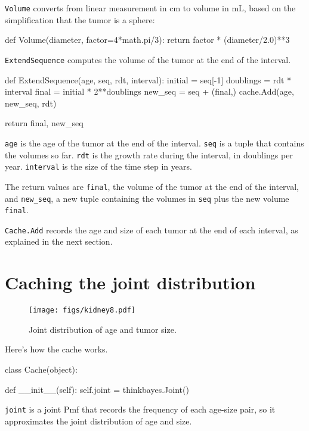 \documentclass[12pt]{book}
\theoremstyle{exercise}
\newcommand{\py}[1]{{\tt #1}}%
\begin{document}
\py{Volume} converts from linear measurement in cm to volume
in mL, based on the simplification that the tumor is a sphere:

\begin{code}
def Volume(diameter, factor=4*math.pi/3):
    return factor * (diameter/2.0)**3
\end{code}

\py{ExtendSequence} computes the volume of the tumor at the
end of the interval.

\begin{code}
def ExtendSequence(age, seq, rdt, interval):
    initial = seq[-1]
    doublings = rdt * interval
    final = initial * 2**doublings
    new_seq = seq + (final,)
    cache.Add(age, new_seq, rdt)

    return final, new_seq
\end{code}

\py{age} is the age of the tumor at the end of the interval.
\py{seq} is a tuple that contains the volumes so far.  \py{rdt} is
the growth rate during the interval, in doublings per year.
\py{interval} is the size of the time step in years.

The return values are \py{final}, the volume of the
tumor at the end of the interval, and \verb"new_seq", a new
tuple containing the volumes in \py{seq} plus the new volume
\py{final}.

\py{Cache.Add} records the age and size of each tumor at the end
of each interval, as explained in the next section.


\section{Caching the joint distribution}

\begin{figure}
\centerline{\texttt{[image: figs/kidney8.pdf]}}
\caption{Joint distribution of age and tumor size.}
\label{fig.kidney8}
\end{figure}

Here's how the cache works.

\begin{code}
class Cache(object):

    def __init__(self):
        self.joint = thinkbayes.Joint()
\end{code}

\py{joint} is a joint Pmf that records the
frequency of each age-size pair, so it approximates the
joint distribution of age and size.
\end{document}

